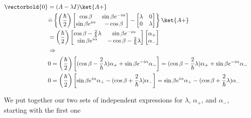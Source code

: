 \begin{answer}
  \begin{equation}
    \begin{split}
      \vectorbold{0}
      &= (A - \lambda I)\ket{A+}\\
      &\dot{=}
      \left\{
      \left(\frac{\hbar}{2}\right)      
      \begin{bmatrix}
        \cos{\beta} & \sin{\beta}e^{-i\alpha}\\
        \sin{\beta}e^{i\alpha} & -\cos{\beta}\\
      \end{bmatrix}
      - 
      \begin{bmatrix}
        \lambda & 0\\
        0 & \lambda\\
      \end{bmatrix}
      \right\}
      \ket{A+}\\
      &=
      \left(\frac{\hbar}{2}\right)
      \begin{bmatrix}
        \cos{\beta} - \frac{2}{\hbar}\lambda & \sin{\beta}e^{-i\alpha}\\
        \sin{\beta}e^{i\alpha} & -\cos{\beta} - \frac{2}{\hbar}\lambda\\
      \end{bmatrix}
      \begin{bmatrix}
        \alpha_+\\
        \alpha_-\\
      \end{bmatrix}
      \\
      &\Rightarrow\\
      &0 =
      \left(\frac{\hbar}{2}\right)
      \left[
        (\cos{\beta}-\frac{2}{\hbar}\lambda)\alpha_+ + \sin{\beta}e^{-i\alpha}\alpha_-
        \right] = (\cos{\beta}-\frac{2}{\hbar}\lambda)\alpha_+ + \sin{\beta}e^{-i\alpha}\alpha_-\\
      &0 =
      \left(\frac{\hbar}{2}\right)
      \left[
        \sin{\beta}e^{i\alpha}\alpha_+ - (\cos{\beta} + \frac{2}{\hbar}\lambda)\alpha_-
        \right] = \sin{\beta}e^{i\alpha}\alpha_+ - (\cos{\beta} + \frac{2}{\hbar}\lambda)\alpha_-\\
    \end{split}
  \end{equation}

  We put together our two sets of independent expressions for
  $\lambda$, $\alpha_+$, and $\alpha_-$, starting with the first one
  

\end{answer}
